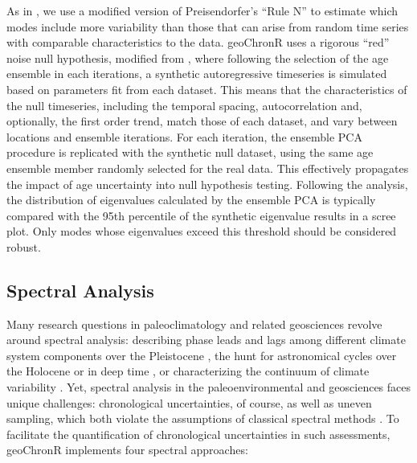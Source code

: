 \documentclass[gchron, manuscript]{copernicus}
\begin{document}
As in \citet{anchukaitis2013mceof}, we use a modified version of
Preisendorfer's ``Rule N'' \citep{PreisendorferMobley1988} to estimate
which modes include more variability than those that can arise from
random time series with comparable characteristics to the data.
geoChronR uses a rigorous ``red'' noise null hypothesis, modified from
\citet{SchneiderNeumaier2001}, where following the selection of the age
ensemble in each iterations, a synthetic autoregressive timeseries is
simulated based on parameters fit from each dataset. This means that the
characteristics of the null timeseries, including the temporal spacing,
autocorrelation and, optionally, the first order trend, match those of
each dataset, and vary between locations and ensemble iterations. For
each iteration, the ensemble PCA procedure is replicated with the
synthetic null dataset, using the same age ensemble member randomly
selected for the real data. This effectively propagates the impact of
age uncertainty into null hypothesis testing. Following the analysis,
the distribution of eigenvalues calculated by the ensemble PCA is
typically compared with the 95th percentile of the synthetic eigenvalue
results in a scree plot. Only modes whose eigenvalues exceed this
threshold should be considered robust.

\hypertarget{sec:spec-theory}{%
\subsection{Spectral Analysis}\label{sec:spec-theory}}

Many research questions in paleoclimatology and related geosciences
revolve around spectral analysis: describing phase leads and lags among
different climate system components over the Pleistocene
\citep[e.g.,][]{imbrie1984orbital, LisieckiRaymo05, khider2017}, the
hunt for astronomical cycles over the Holocene \citep{bond2001} or in
deep time
\citep{MeyersSageman_2007, Meyers_2012, Meyers_2015, lisiecki2010}, or
characterizing the continuum of climate variability
\citep{Huybers_Curry2006, ZhuPNAS2019}. Yet, spectral analysis in the
paleoenvironmental and geosciences faces unique challenges:
chronological uncertainties, of course, as well as uneven sampling,
which both violate the assumptions of classical spectral methods
\citep{Ghil02}. To facilitate the quantification of chronological
uncertainties in such assessments, geoChronR implements four spectral
approaches:
\end{document}
